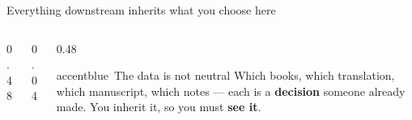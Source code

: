 \begin{frame}{Everything downstream inherits what you choose here}
\begin{columns}[t, totalwidth=\textwidth]
\begin{column}{0.48\textwidth}
    \end{column}
    \begin{column}{0.04\textwidth}\end{column}
    \begin{column}{0.48\textwidth}
      \begin{featbox}{accentblue}{\faExclamationCircle\ The data is not neutral}
        \scriptsize Which books, which translation, which manuscript, which notes ---
        each is a \textbf{decision} someone already made. You inherit it, so you must
        \textbf{see it}.
      \end{featbox}
    \end{column}
  \end{columns}
\end{frame}


